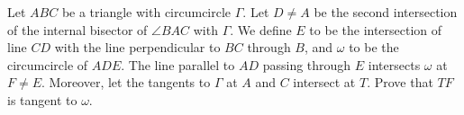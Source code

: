 Let $ABC$ be a triangle with circumcircle $\Gamma$.
Let $D \neq A$ be the second intersection of the internal bisector of $\angle BAC$ with $\Gamma$.
We define $E$ to be the intersection of line $CD$ with the line perpendicular to $BC$ through $B$,
and $\omega$ to be the circumcircle of $ADE$.
The line parallel to $AD$ passing through $E$ intersects $\omega$ at $F \neq E$.
Moreover, let the tangents to $\Gamma$ at $A$ and $C$ intersect at $T$.
Prove that $TF$ is tangent to $\omega$.
